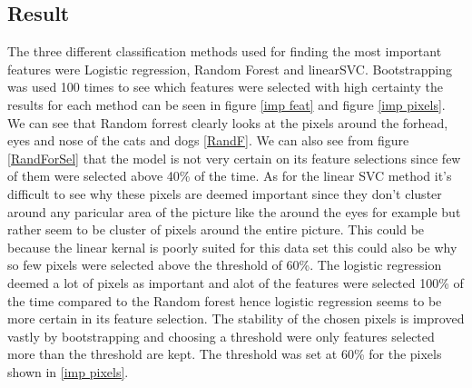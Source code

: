 \documentclass{article}
\begin{document}
\subsection{Result}
The three different classification methods used for finding the most important features were Logistic regression, Random Forest and linearSVC. Bootstrapping was used 100 times to see which features were selected with high certainty the results for each method can be seen in figure \ref{imp feat} and figure \ref{imp pixels}. We can see that Random forrest clearly looks at the pixels around the forhead, eyes and nose of the cats and dogs \ref{RandF}. We can also see from figure \ref{RandForSel} that the model is not very certain on its feature selections since few of them were selected above 40\% of the time. As for the linear SVC method it's difficult to see why these pixels are deemed important since they don't cluster around any paricular area of the picture like the around the eyes for example but rather seem to be cluster of pixels around the entire picture. This could be because the linear kernal is poorly suited for this data set this could also be why so few pixels were selected above the threshold of 60\%. The logistic regression deemed a lot of pixels as important and alot of the features were selected 100\% of the time compared to the Random forest hence logistic regression seems to be more certain in its feature selection.  The stability of the chosen pixels is improved vastly by bootstrapping and choosing a threshold were only features selected more than the threshold are kept. The threshold was set at 60\% for the pixels shown in \ref{imp pixels}.
\end{document}
